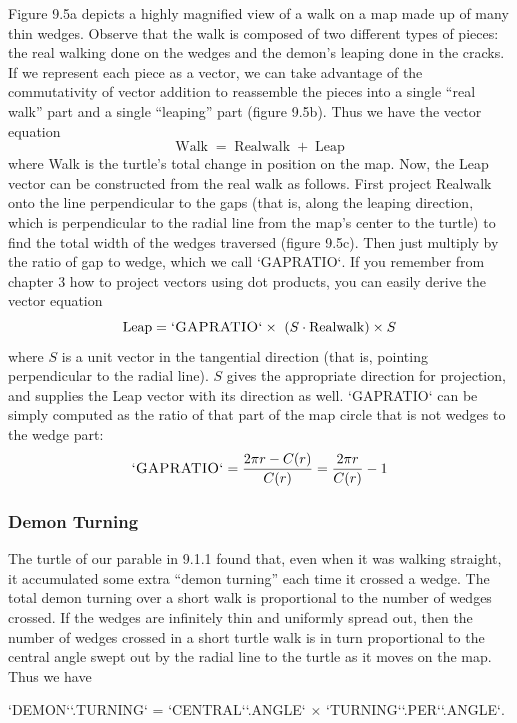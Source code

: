 \documentclass{book}
\begin{document}
Figure 9.5a depicts a highly magnified view of a walk on a map made up
of many thin wedges. Observe that the walk is composed of two different
types of pieces: the real walking done on the wedges and the demon's
leaping done in the cracks. If we represent each piece as a vector, we can
take advantage of the commutativity of vector addition to reassemble
the pieces into a single ``real walk'' part and a single ``leaping'' part
(figure 9.5b). Thus we have the vector equation
$$\operatorname{Walk} = \operatorname{Realwalk} + \operatorname{Leap}$$
where Walk is the turtle's total change in position on the map.
Now, the Leap vector can be constructed from the real walk as follows.
First project Realwalk onto the line perpendicular to the gaps (that
is, along the leaping direction, which is perpendicular to the radial
line from the map's center to the turtle) to find the total width of the
wedges traversed (figure 9.5c). Then just multiply by the ratio of gap to
wedge, which we call \textsc{`GAPRATIO`}. If you remember from chapter 3 how
to project vectors using dot products, you can easily derive the vector
equation
$$\operatorname{Leap} =  \text{\textsc{`GAPRATIO`}}  \times\ (S \cdot \operatorname{Realwalk}) \times S$$ 
where $S$ is a unit vector in the tangential direction (that is, pointing
perpendicular to the radial line). $S$ gives the appropriate direction
for projection, and supplies the Leap vector with its direction as well.
\textsc{`GAPRATIO`} can be simply computed as the ratio of that part of the map
circle that is not wedges to the wedge part:
$$\text{\textsc{`GAPRATIO`}} = \frac {2 \pi r - C(r)}{C(r)} = \frac {2 \pi r} {C(r)} - 1 $$

\subsubsection{Demon Turning}

The turtle of our parable in 9.1.1 found that, even when it was walking straight, it accumulated some extra ``demon turning'' each time it
crossed a wedge. The total demon turning over a short walk is proportional to the number of wedges crossed. If the wedges are infinitely thin
and uniformly spread out, then the number of wedges crossed in a short
turtle walk is in turn proportional to the central angle swept out by the
radial line to the turtle as it moves on the map. Thus we have

\textsc{`DEMON`}\textsc{`.TURNING`} = \textsc{`CENTRAL`}\textsc{`.ANGLE`} $\times$ \textsc{`TURNING`}\textsc{`.PER`}\textsc{`.ANGLE`}. 
\end{document}
